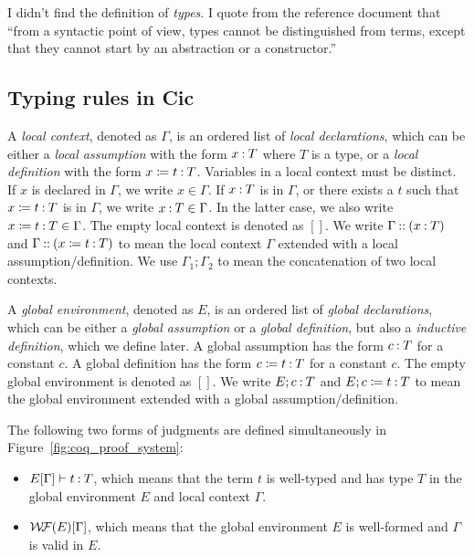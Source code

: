 \documentclass[letter,12pt]{amsart}
\begin{document}
\begin{remark}
I didn't find the definition of \emph{types}.
I quote from the reference document that
``from a syntactic point of view, types cannot be distinguished from terms, 
except that they cannot start by an abstraction or a constructor.''
\end{remark}

\subsection{Typing rules in Cic}

\begin{definition}
A \emph{local context}, denoted as $\Gamma$,
is an ordered list of \emph{local declarations},
which can be either a \emph{local assumption} with the form
$x \mathbin{:} T$ where $T$ is a type,
or a \emph{local definition} with the form
$x \coloneq t \mathbin{:} T$.
Variables in a local context must be distinct.
If $x$ is declared in $\Gamma$, we write $x \in \Gamma$.
If $x \mathbin{:} T$ is in $\Gamma$, or there exists a $t$ such that
$x \coloneq t \mathbin{:} T$ is in $\Gamma$, we write $x \mathbin{:} T \in \Gamma$.
In the latter case, we also write $x \coloneq t \mathbin{:} T \in \Gamma$.
The empty local context is denoted as $[]$.
We write $\Gamma \mathbin{::} (x \mathbin{:} T)$ and 
$\Gamma \mathbin{::} (x \coloneq t \mathbin{:} T)$ to mean
the local context $\Gamma$ extended with a local assumption/definition.
We use $\Gamma_1 ; \Gamma_2$ to mean the concatenation of two
local contexts.
\end{definition}

\begin{definition}
A \emph{global environment}, denoted as $E$,
is an ordered list of \emph{global declarations},
which can be either a \emph{global assumption} 
or a \emph{global definition},
but also a \emph{inductive definition}, which we define later.
A global assumption has the form $c \mathbin{:} T$ for a constant $c$.
A global definition has the form $c \coloneq t \mathbin{:} T$ for a constant $c$.
The empty global environment is denoted as $[]$.
We write $E ; c \mathbin{:} T$ and $E ; c \coloneq t \mathbin{:} T$ to mean
the global environment extended with a global assumption/definition.
\end{definition}

\begin{definition}
The following two forms of judgments are defined simultaneously in 
Figure~\ref{fig:coq_proof_system}:
\begin{itemize}
\item $E[\Gamma] \vdash t \mathbin{:} T$, which means that the term $t$ is
well-typed and has type $T$ in the global environment $E$
and local context $\Gamma$.
\item $\mathcal{W\!F}(E)[\Gamma]$, which means that the global environment $E$
is well-formed and $\Gamma$ is valid in $E$.
\end{itemize}
\end{definition}
\end{document}
